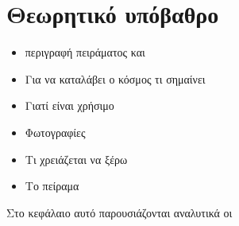 \chapter{Θεωρητικό υπόβαθρο}
\begin{itemize}
\item περιγραφή πειράματος και
\item Για να καταλάβει ο κόσμος τι σημαίνει
\item Γιατί είναι χρήσιμο
\item Φωτογραφίες
\item Τι χρειάζεται να ξέρω
\item Το πείραμα
\end{itemize}

Στο κεφάλαιο αυτό παρουσιάζονται αναλυτικά οι 


